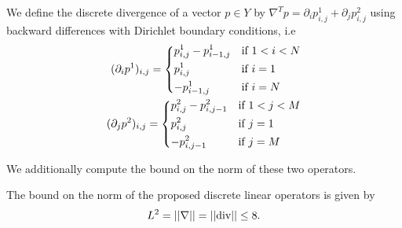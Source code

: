     \begin{definition} %
    \label{def:discrete_divergence_operator}

        We define the discrete divergence of a vector $p \in Y$ by $\nabla^{T} p = \partial_{i}p^{1}_{i, j} + \partial_{j}p^{2}_{i, j}$ using backward differences with Dirichlet boundary conditions, i.e
            \begin{eqnarray}
                (\partial_{i}p^{1})_{i, j} =
                    \begin{dcases*}
                        p^{1}_{i, j} - p^{1}_{i-1, j} & \textnormal{if $1 < i < N$}\\
                        p^{1}_{i, j} & \textnormal{if $i = 1$}\\
                        -p^{1}_{i-1, j} & \textnormal{if $i = N$}
                    \end{dcases*}
                \label{eq:backward_partial_i} \\
                (\partial_{j}p^{2})_{i, j} =
                    \begin{dcases*}
                        p^{2}_{i, j} - p^{2}_{i, j-1} & \textnormal{if $1 < j < M$}\\
                        p^{2}_{i, j} & \textnormal{if $j = 1$}\\
                        -p^{2}_{i, j-1} & \textnormal{if $j = M$}
                    \end{dcases*}
                \label{eq:backward_partial_j}
            \end{eqnarray}

    \end{definition}

    We additionally compute the bound on the norm of these two operators.

    \begin{proposition} %
        \label{prop:bound_on_the_norm}

        The bound on the norm of the proposed discrete linear operators is given by
            \begin{equation}
                L^{2} = ||\nabla|| = ||\textnormal{div}|| \le 8.
            \end{equation}

    \end{proposition}

